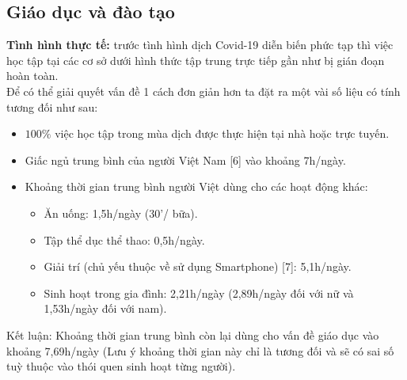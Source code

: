 \subsection{Giáo dục và đào tạo}
\textbf{Tình hình thực tế:} trước tình hình dịch Covid-19 diễn biến phức tạp thì việc học tập tại các cơ sở dưới hình thức tập trung trực tiếp gần như bị gián đoạn hoàn toàn.\\ 
Để có thể giải quyết vấn đề 1 cách đơn giản hơn ta đặt ra một vài số liệu có tính tương đối như sau:
\begin{itemize}
    \item $100 \%$ việc học tập trong mùa dịch được thực hiện tại nhà hoặc trực tuyến.
    \item Giấc ngủ trung bình của người Việt Nam [6] vào khoảng 7h/ngày.
    \item Khoảng thời gian trung bình người Việt  dùng cho các hoạt động khác:
    \begin{itemize}
        \item Ăn uống: 1,5h/ngày (30’/ bữa).
        \item Tập thể dục thể thao: 0,5h/ngày.
        \item Giải trí (chủ yếu thuộc về sử dụng Smartphone) [7]: 5,1h/ngày.
        \item Sinh hoạt trong gia đình: 2,21h/ngày (2,89h/ngày đối với nữ và 1,53h/ngày đối với nam).
    \end{itemize}
\end{itemize}
Kết luận: Khoảng thời gian trung bình còn lại dùng cho vấn đề giáo dục vào khoảng 7,69h/ngày (Lưu ý khoảng thời gian này chỉ là tương đối và sẽ có sai số tuỳ thuộc vào thói quen sinh hoạt từng người).\\

